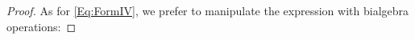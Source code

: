 \documentclass[\MainFolder/Text.tex]{subfiles}
\begin{document}
\begin{proof}
As for \eqref{Eq:FormIV}, we prefer to manipulate the expression with bialgebra operations:
%
%
%
%

\end{proof}
\end{document}
